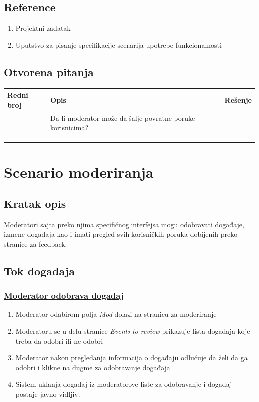 \documentclass[11pt,a4paper]{article}
\begin{document}
\subsection{Reference}
\begin{enumerate}
    \item Projektni zadatak
    \item Uputstvo za pisanje specifikacije scenarija upotrebe funkcionalnosti
\end{enumerate}
\subsection{Otvorena pitanja}
\begin{center}
\begin{tabular}{| >{\centering\arraybackslash}m{1.9cm} | >{\centering\arraybackslash}m{4.9cm} | >{\centering\arraybackslash}m{4.9cm} |}
\hline
\rowcolor[HTML]{000000} 
{\color[HTML]{FFFFFF} Redni broj } & {\color[HTML]{FFFFFF} Opis } & {\color[HTML]{FFFFFF} Rešenje } \\ \hline
1 & Da li moderator može da šalje povratne poruke korisnicima? & \\ \hline
 &  &  \\ \hline
 &  &  \\ \hline
 &  &  \\ \hline
\end{tabular}
\end{center}

\newpage

\section{Scenario moderiranja}
\subsection{Kratak opis}
Moderatori sajta preko njima specifičnog interfejsa mogu odobravati događaje, izmene događaja kao i imati pregled svih korisničkih poruka dobijenih preko stranice za feedback.
\subsection{Tok događaja}
\subsubsection{\underline{Moderator odobrava događaj}}
\begin{enumerate}
    \item Moderator odabirom polja \textit{Mod} dolazi na stranicu za moderiranje
    \item Moderatoru se u delu stranice \textit{Events to review} prikazuje lista događaja koje treba da odobri ili ne odobri 
    \item Moderator nakon pregledanja informacija o događaju odlučuje da želi da ga odobri i klikne na dugme za odobravanje događaja
    \item Sistem uklanja događaj iz moderatorove liste za odobravanje i događaj postaje javno vidljiv.
\end{enumerate}
\end{document}
